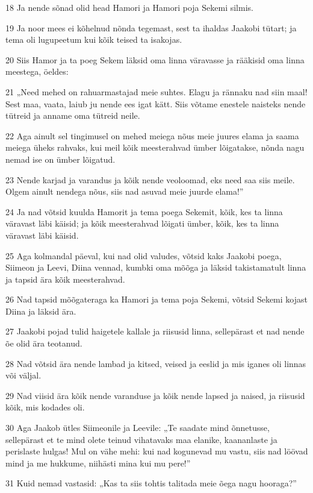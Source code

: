 \par 18 Ja nende sõnad olid head Hamori ja Hamori poja Sekemi silmis.
\par 19 Ja noor mees ei kõhelnud nõnda tegemast, sest ta ihaldas Jaakobi tütart; ja tema oli lugupeetum kui kõik teised ta isakojas.
\par 20 Siis Hamor ja ta poeg Sekem läksid oma linna väravasse ja rääkisid oma linna meestega, öeldes:
\par 21 „Need mehed on rahuarmastajad meie suhtes. Elagu ja rännaku nad siin maal! Sest maa, vaata, laiub ju nende ees igat kätt. Siis võtame enestele naisteks nende tütreid ja anname oma tütreid neile.
\par 22 Aga ainult sel tingimusel on mehed meiega nõus meie juures elama ja saama meiega üheks rahvaks, kui meil kõik meesterahvad ümber lõigatakse, nõnda nagu nemad ise on ümber lõigatud.
\par 23 Nende karjad ja varandus ja kõik nende veoloomad, eks need saa siis meile. Olgem ainult nendega nõus, siis nad asuvad meie juurde elama!”
\par 24 Ja nad võtsid kuulda Hamorit ja tema poega Sekemit, kõik, kes ta linna väravast läbi käisid; ja kõik meesterahvad lõigati ümber, kõik, kes ta linna väravast läbi käisid.
\par 25 Aga kolmandal päeval, kui nad olid valudes, võtsid kaks Jaakobi poega, Siimeon ja Leevi, Diina vennad, kumbki oma mõõga ja läksid takistamatult linna ja tapsid ära kõik meesterahvad.
\par 26 Nad tapsid mõõgateraga ka Hamori ja tema poja Sekemi, võtsid Sekemi kojast Diina ja läksid ära.
\par 27 Jaakobi pojad tulid haigetele kallale ja riisusid linna, sellepärast et nad nende õe olid ära teotanud.
\par 28 Nad võtsid ära nende lambad ja kitsed, veised ja eeslid ja mis iganes oli linnas või väljal.
\par 29 Nad viisid ära kõik nende varanduse ja kõik nende lapsed ja naised, ja riisusid kõik, mis kodades oli.
\par 30 Aga Jaakob ütles Siimeonile ja Leevile: „Te saadate mind õnnetusse, sellepärast et te mind olete teinud vihatavaks maa elanike, kaananlaste ja perislaste hulgas! Mul on vähe mehi: kui nad kogunevad mu vastu, siis nad löövad mind ja me hukkume, niihästi mina kui mu pere!”
\par 31 Kuid nemad vastasid: „Kas ta siis tohtis talitada meie õega nagu hooraga?”

